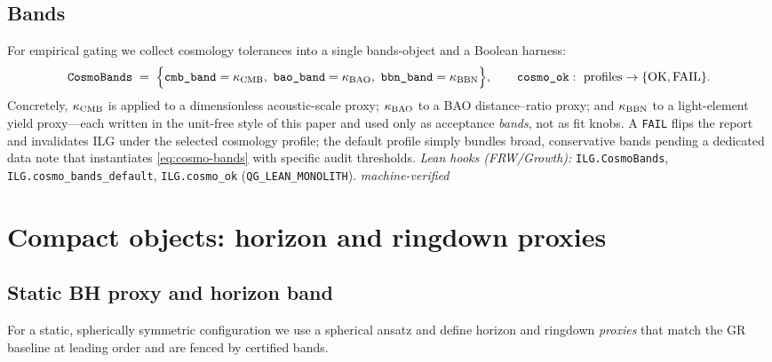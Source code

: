 \documentclass[12pt,a4paper]{article}
\begin{document}
\subsection{Bands}
For empirical gating we collect cosmology tolerances into a single bands-object and a Boolean harness:
\begin{equation}
  \texttt{CosmoBands}
  \;=\;
  \Bigl\{\texttt{cmb\_band}=\kappa_{\rm CMB},\ 
        \texttt{bao\_band}=\kappa_{\rm BAO},\ 
        \texttt{bbn\_band}=\kappa_{\rm BBN}\Bigr\},
  \qquad
  \texttt{cosmo\_ok}:\ \text{profiles}\to\{\text{OK},\text{FAIL}\}.
  \label{eq:cosmo-bands}
\end{equation}
Concretely, \(\kappa_{\rm CMB}\) is applied to a dimensionless acoustic-scale proxy; \(\kappa_{\rm BAO}\) to a BAO distance–ratio proxy; and \(\kappa_{\rm BBN}\) to a light-element yield proxy—each written in the unit-free style of this paper and used only as acceptance \emph{bands}, not as fit knobs. A \texttt{FAIL} flips the report and invalidates ILG under the selected cosmology profile; the default profile simply bundles broad, conservative bands pending a dedicated data note that instantiates \eqref{eq:cosmo-bands} with specific audit thresholds. 
\emph{Lean hooks (FRW/Growth):} \texttt{ILG.CosmoBands}, \texttt{ILG.cosmo\_bands\_default}, \texttt{ILG.cosmo\_ok} (\texttt{QG\_LEAN\_MONOLITH}). \emph{machine-verified}

\section{Compact objects: horizon and ringdown proxies}

\subsection{Static BH proxy and horizon band}
For a static, spherically symmetric configuration we use a spherical ansatz and define horizon and ringdown \emph{proxies} that match the GR baseline at leading order and are fenced by certified bands.
\end{document}
